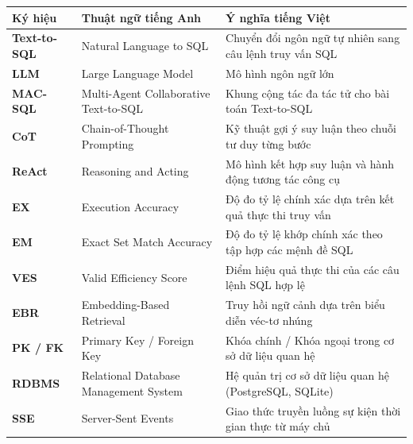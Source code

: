 \documentclass[12pt,a4paper]{report}
\begin{document}
\begin{table}[H]
\centering
\renewcommand{\arraystretch}{1.3}
\begin{tabular}{@{}p{3.0cm}p{5.5cm}p{6.5cm}@{}}
\toprule
\textbf{Ký hiệu} & \textbf{Thuật ngữ tiếng Anh} & \textbf{Ý nghĩa tiếng Việt} \\
\midrule
\textbf{Text-to-SQL} & Natural Language to SQL & Chuyển đổi ngôn ngữ tự nhiên sang câu lệnh truy vấn SQL \\
\textbf{LLM} & Large Language Model & Mô hình ngôn ngữ lớn \\
\textbf{MAC-SQL} & Multi-Agent Collaborative Text-to-SQL & Khung cộng tác đa tác tử cho bài toán Text-to-SQL \cite{wang2025macsql} \\
\textbf{CoT} & Chain-of-Thought Prompting & Kỹ thuật gợi ý suy luận theo chuỗi tư duy từng bước \cite{tai2023cot} \\
\textbf{ReAct} & Reasoning and Acting & Mô hình kết hợp suy luận và hành động tương tác công cụ \cite{yao2023react} \\
\textbf{EX} & Execution Accuracy & Độ đo tỷ lệ chính xác dựa trên kết quả thực thi truy vấn \\
\textbf{EM} & Exact Set Match Accuracy & Độ đo tỷ lệ khớp chính xác theo tập hợp các mệnh đề SQL \\
\textbf{VES} & Valid Efficiency Score & Điểm hiệu quả thực thi của các câu lệnh SQL hợp lệ \cite{li2023bird} \\
\textbf{EBR} & Embedding-Based Retrieval & Truy hồi ngữ cảnh dựa trên biểu diễn véc-tơ nhúng \cite{chen2025enterprise} \\
\textbf{PK / FK} & Primary Key / Foreign Key & Khóa chính / Khóa ngoại trong cơ sở dữ liệu quan hệ \\
\textbf{RDBMS} & Relational Database Management System & Hệ quản trị cơ sở dữ liệu quan hệ (PostgreSQL, SQLite) \\
\textbf{SSE} & Server-Sent Events & Giao thức truyền luồng sự kiện thời gian thực từ máy chủ \\
\bottomrule
\end{tabular}
\end{table}

\newpage
{}
\setcounter{page}{1}

\end{document}
